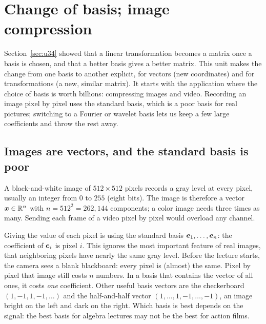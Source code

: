 \section{Change of basis; image compression}\label{sec:u35}

Section~\ref{sec:u34} showed that a linear transformation becomes a matrix once a basis is
chosen, and that a better basis gives a better matrix. This unit makes the change from one
basis to another explicit, for vectors (new coordinates) and for transformations (a new,
similar matrix). It starts with the application where the choice of basis is worth billions:
compressing images and video. Recording an image pixel by pixel uses the standard basis, which
is a poor basis for real pictures; switching to a Fourier or wavelet basis lets us keep a few
large coefficients and throw the rest away.

\subsection{Images are vectors, and the standard basis is poor}

A black-and-white image of $512\times512$ pixels records a gray level at every pixel, usually an
integer from $0$ to $255$ (eight bits). The image is therefore a vector $\boldsymbol{x}\in\mathbb{R}^n$ with
$n=512^2=262{,}144$ components; a color image needs three times as many. Sending each frame of a
video pixel by pixel would overload any channel.

Giving the value of each pixel is using the standard basis $\boldsymbol{e}_1,\dots,\boldsymbol{e}_n$: the coefficient of
$\boldsymbol{e}_i$ is pixel $i$. This ignores the most important feature of real images, that neighboring
pixels have nearly the same gray level. Before the lecture starts, the camera sees a blank
blackboard: every pixel is (almost) the same. Pixel by pixel that image still costs $n$ numbers.
In a basis that contains the vector of all ones, it costs \emph{one} coefficient. Other useful
basis vectors are the checkerboard $(1,-1,1,-1,\dots)$ and the half-and-half vector
$(1,\dots,1,-1,\dots,-1)$, an image bright on the left and dark on the right. Which basis is best
depends on the signal: the best basis for algebra lectures may not be the best for action films.

